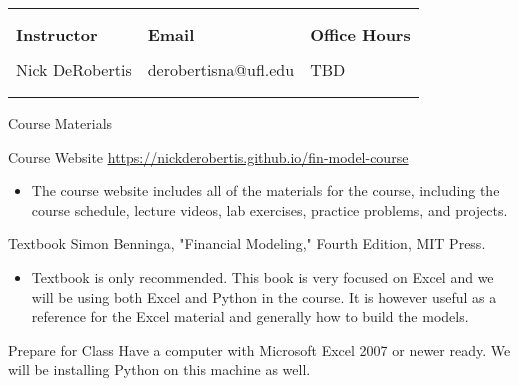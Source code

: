 \documentclass[11pt]{resume}
\begin{document}
\begin{tabular}{C{5.5cm}C{5.5cm}C{5.5cm}}
\toprule
\\

\\

\Large \textbf{Instructor} & \Large \textbf{Email} & \Large \textbf{Office Hours}\\

\\

Nick DeRobertis & derobertisna@ufl.edu & TBD\\

\\

\\

\end{tabular}
\begin{section}{Course Materials}
\begin{subsection}{Course Website}
\textcolor{blue}{\underline{\href{https://nickderobertis.github.io/fin-model-course}{https://nickderobertis.github.io/fin-model-course}}}
\begin{itemize}
\item The course website includes all of the materials for the course, including the course schedule, lecture videos, lab exercises, practice problems, and projects.
\end{itemize}
\end{subsection}
\begin{subsection}{Textbook}
Simon Benninga, "Financial Modeling," Fourth Edition, MIT Press.
\begin{itemize}
\item Textbook is only recommended. This book is very focused on Excel and we will be using both Excel
and Python in the course. It is however useful as a reference for the Excel material and generally how
to build the models.
\end{itemize}
\end{subsection}
\begin{subsection}{Prepare for Class}
Have a computer with Microsoft Excel 2007 or newer ready. We will be installing Python on this machine as well.
\end{subsection}
\end{section}
\vspace{0.5cm}
\end{document}
